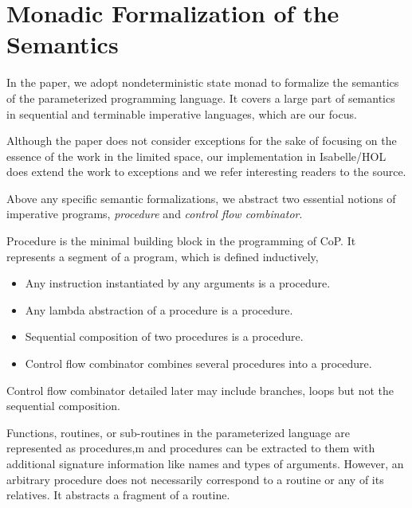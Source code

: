 \section{Monadic Formalization of the Semantics}\label{sec:prog-sem}

In the paper, we adopt nondeterministic state monad to formalize the semantics of the parameterized programming language.
It covers a large part of semantics in sequential and terminable imperative languages, which are our focus.

Although the paper does not consider exceptions for the sake of focusing on the essence of the work in the limited space, our implementation in Isabelle/HOL does extend the work to exceptions and we refer interesting readers to the source.


Above any specific semantic formalizations, we abstract two essential notions of imperative programs, \emph{procedure} and \emph{control flow combinator}.


Procedure is the minimal building block in the programming of CoP.
It represents a segment of a program, which is defined inductively,
\begin{itemize}
\item Any instruction instantiated by any arguments is a procedure.
\item Any lambda abstraction of a procedure is a procedure.
\item Sequential composition of two procedures is a procedure.
\item Control flow combinator combines several procedures into a procedure.
\end{itemize}
Control flow combinator detailed later may include branches, loops but not the sequential composition.

Functions, routines, or sub-routines in the parameterized language are represented as procedures,m
and procedures can be extracted to them with additional signature information like names and types of arguments.
However, an arbitrary procedure does not necessarily correspond to a routine or any of its relatives.
It abstracts a fragment of a routine.%


